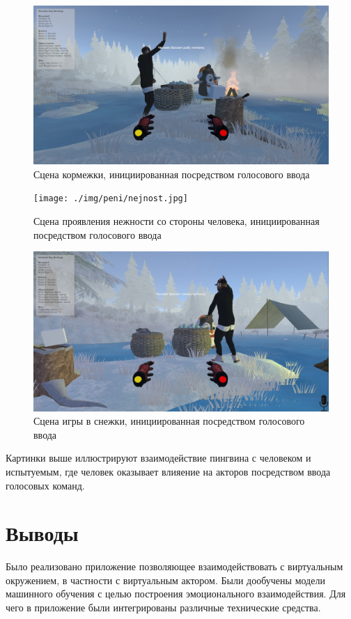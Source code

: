 \begin{figure}[h]
\includegraphics[width=0.75\columnwidth]{./img/peni/kormejka.jpg}
\centering
\caption{Сцена кормежки, инициированная посредством голосового ввода}
\label{pic:kormejka}
\end{figure}

\begin{figure}[h]
\texttt{[image: ./img/peni/nejnost.jpg]}
\centering
\caption{Сцена проявления нежности со стороны человека, инициированная посредством голосового ввода}
\label{pic:nejnost}
\end{figure}

\begin{figure}[h]
\includegraphics[width=0.75\columnwidth]{./img/peni/snejok.jpg}
\centering
\caption{Сцена игры в снежки, инициированная посредством голосового ввода}
\label{pic:snejok}
\end{figure}

Картинки выше иллюстрируют взаимодействие пингвина с человеком и испытуемым, 
где человек оказывает влияение на акторов посредством ввода голосовых команд.

\section{Выводы}

Было реализовано приложение позволяющее взаимодействовать с виртуальным окружением, в частности с виртуальным актором. 
Были дообучены модели машинного обучения с целью построения эмоционального взаимодействия. 
Для чего в приложение были интегрированы различные технические средства.
